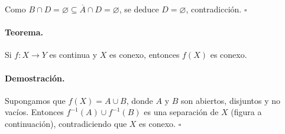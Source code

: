 Como $B\cap D=\varnothing\subseteq \overline{A} \cap D =\varnothing$, se deduce $D=\varnothing$, contradicción. \hfill$\square$





\paragraph{\textbf{Teorema.}}
Si $f\colon X\to Y$ es continua y $X$ es conexo, entonces $f(X)$ es conexo.

\paragraph{\textbf{Demostración.}}
Supongamos que $f(X)=A\cup B$, donde $A$ y $B$ son abiertos, disjuntos y no vacíos. Entonces $f^{-1}(A)\cup f^{-1}(B)$ es una separación de $X$ (figura a continuación), contradiciendo que $X$ es conexo. \hfill$\square$

